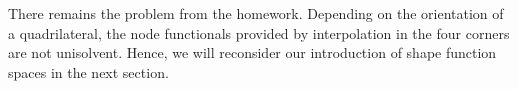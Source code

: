 


\begin{remark}
  There remains the problem from the homework. Depending on the
  orientation of a quadrilateral, the node functionals provided by
  interpolation in the four corners are not unisolvent. Hence, we will
  reconsider our introduction of shape function spaces in the next
  section.
\end{remark}

